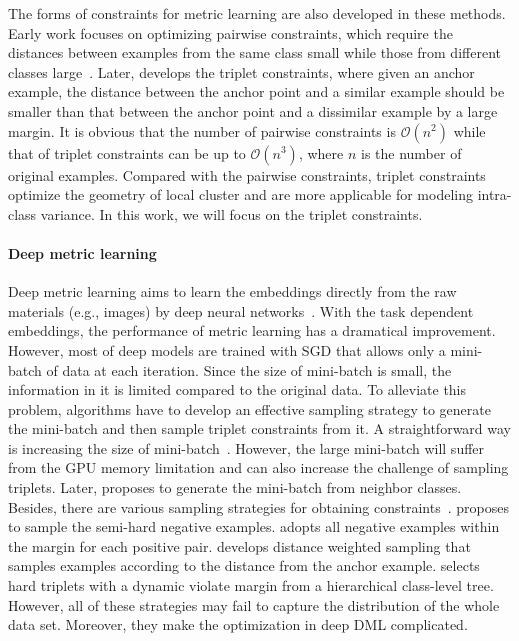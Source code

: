 \documentclass[10pt,twocolumn,letterpaper]{article}
\def \OO {\mathcal{O}}
\begin{document}
The forms of constraints for metric learning are also developed in these methods. Early work focuses on optimizing pairwise constraints, which require the distances between examples from the same class small while those from different classes large~\cite{XingNJR02}. Later, \cite{WeinbergerS09} develops the triplet constraints, where given an anchor example, the distance between the anchor point and a similar example should be smaller than that between the anchor point and a dissimilar example by a large margin. It is obvious that the number of pairwise constraints is $\OO(n^2)$ while that of triplet constraints can be up to $\OO(n^3)$, where $n$ is the number of original examples. Compared with the pairwise constraints, triplet constraints optimize the geometry of local cluster and are more applicable for modeling intra-class variance. In this work, we will focus on the triplet constraints.

\paragraph{Deep metric learning}
Deep metric learning aims to learn the embeddings directly from the raw materials (e.g., images) by deep neural networks~\cite{ParkhiVZ15,SchroffKP15}. With the task dependent embeddings, the performance of metric learning has a dramatical improvement. However, most of deep models are trained with SGD that allows only a mini-batch of data at each iteration. Since the size of mini-batch is small, the information in it is limited compared to the original data. To alleviate this problem, algorithms have to develop an effective sampling strategy to generate the mini-batch and then sample triplet constraints from it. A straightforward way is increasing the size of mini-batch~\cite{SchroffKP15}. However, the large mini-batch will suffer from the GPU memory limitation and can also increase the challenge of sampling triplets. Later, \cite{RippelPDB15} proposes to generate the mini-batch from neighbor classes. Besides, there are various sampling strategies for obtaining constraints~\cite{GeHDS18,ManmathaWSK17,SchroffKP15,SongXJS16}. \cite{SchroffKP15} proposes to sample the semi-hard negative examples. \cite{SongXJS16} adopts all negative examples within the margin for each positive pair. \cite{ManmathaWSK17} develops distance weighted sampling that samples examples according to the distance from the anchor example. \cite{GeHDS18} selects hard triplets with a dynamic violate margin from a hierarchical class-level tree. However, all of these strategies may fail to capture the distribution of the whole data set. Moreover, they make the optimization in deep DML complicated. 
\end{document}
